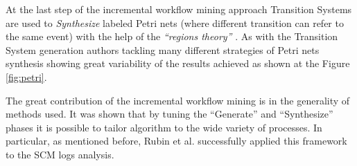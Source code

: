 At the last step of the incremental workflow mining approach Transition Systems are used to \textit{Synthesize} labeled Petri nets (where different transition can refer to the same event) with the help of the \textit{``regions theory''} \cite{citeulike:5128170}. As with the Transition System generation authors tackling many different strategies of Petri nets synthesis showing great variability of the results achieved as shown at the Figure \ref{fig:petri}.

The great contribution of the incremental workflow mining is in the generality of methods used. It was shown that by tuning the ``Generate'' and ``Synthesize'' phases it is possible to tailor algorithm to the wide variety of processes. In particular, as mentioned before, Rubin et al. successfully applied this framework to the SCM logs analysis.